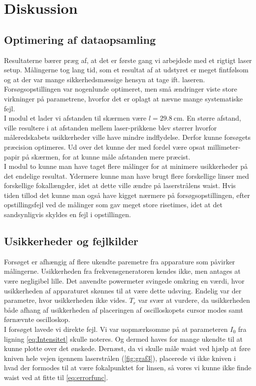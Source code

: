 \documentclass[main]{subfiles}
\begin{document}
\section{Diskussion}
\subsection{Optimering af dataopsamling}
Resultaterne bærer præg af, at det er første gang vi arbejdede med et rigtigt laser setup. Målingerne tog lang tid, som et resultat af at udstyret er meget fintfølsom og at der var mange sikkerhedsmæssige hensyn at tage ift. laseren. Forsøgsopstillingen var nogenlunde optimeret, men små ændringer viste store virkninger på parametrene, hvorfor det er oplagt at nævne mange systematiske fejl.
\\
I modul et lader vi afstanden til skærmen være $l = \SI{29,8}{\centi\meter}$. En større afstand, ville resultere i at afstanden mellem laser-prikkene blev størrer hvorfor måleredskabets usikkerheder ville have mindre indflydelse. Derfor kunne forsøgets præcision optimeres. Ud over det kunne der med fordel være opsat millimeter-papir på skærmen, for at kunne måle afstanden mere præcist.
\\
I modul to kunne man have taget flere målinger for at minimere usikkerheder på det endelige resultat. Ydermere kunne man have brugt flere forskellige linser med forskellige fokallængder, idet at dette ville ændre på laserstrålens waist.
Hvis tiden tillod det kunne man også have kigget nærmere på forsøgsopstillingen, efter opstillingsfejl ved de målinger som gav meget store risetimes, idet at det sandsynligvis skyldes en fejl i opstillingen.

\subsection{Usikkerheder og fejlkilder}
Forsøget er afhængig af flere ukendte paremetre fra apparature som påvirker målingerne. Usikkerheden fra frekvensgeneratoren kendes ikke, men antages at være negligibel lille. Det anvendte powermeter svingede omkring en værdi, hvor usikkerheden af apparaturet skønnes til at være dette udsving. Endelig var der parametre, hvor usikkerheden ikke vides. $T_r$ var svær at vurdere, da usikkerheden både afhang af usikkerheden af placeringen af oscilloskopets cursor modes samt førnævnte oscilloskop.
\\
I forsøget lavede vi direkte fejl. Vi var uopmærksomme på at parameteren $I_0$ fra ligning \cref{eq:Intensitet} skulle noteres. Og dermed haves for mange ukendte til at kunne plotte over det ønskede. Dernæst, da vi skulle måle waist ved hjælp at føre kniven hele vejen igennem laserstrålen (\cref{fig:graf3}), placerede vi ikke kniven i hvad der formodes til at være fokalpunktet for linsen, så vores vi kunne ikke finde waist ved at fitte til \cref{eq:errorfunc}.
\end{document}
